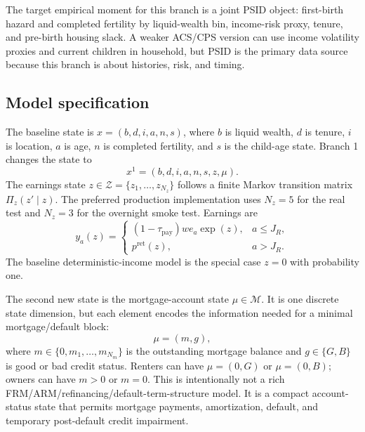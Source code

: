 \documentclass[11pt]{article}
\newcommand{\Zset}{\mathcal Z}
\newcommand{\Mset}{\mathcal M}
\begin{document}
The target empirical moment for this branch is a joint PSID object: first-birth hazard and completed fertility by liquid-wealth bin, income-risk proxy, tenure, and pre-birth housing slack. A weaker ACS/CPS version can use income volatility proxies and current children in household, but PSID is the primary data source because this branch is about histories, risk, and timing.

\subsection{Model specification}

The baseline state is $x=(b,d,i,a,n,s)$, where $b$ is liquid wealth, $d$ is tenure, $i$ is location, $a$ is age, $n$ is completed fertility, and $s$ is the child-age state. Branch 1 changes the state to
\begin{equation}
    x^1=(b,d,i,a,n,s,z,\mu).
\end{equation}
The earnings state $z\in\Zset=\{z_1,\ldots,z_{N_z}\}$ follows a finite Markov transition matrix $\Pi_z(z'\mid z)$. The preferred production implementation uses $N_z=5$ for the real test and $N_z=3$ for the overnight smoke test. Earnings are
\begin{equation}
    y_a(z)=
    \begin{cases}
    (1-\tau_{\mathrm{pay}})w e_a \exp(z), & a\leq J_R,\\
    p^{\mathrm{ret}}(z), & a>J_R.
    \end{cases}
    \label{eq:income-risk}
\end{equation}
The baseline deterministic-income model is the special case $z=0$ with probability one.

The second new state is the mortgage-account state $\mu\in\Mset$. It is one discrete state dimension, but each element encodes the information needed for a minimal mortgage/default block:
\begin{equation}
    \mu=(m,g),
\end{equation}
where $m\in\{0,m_1,\ldots,m_{N_m}\}$ is the outstanding mortgage balance and $g\in\{G,B\}$ is good or bad credit status. Renters can have $\mu=(0,G)$ or $\mu=(0,B)$; owners can have $m>0$ or $m=0$. This is intentionally not a rich FRM/ARM/refinancing/default-term-structure model. It is a compact account-status state that permits mortgage payments, amortization, default, and temporary post-default credit impairment.
\end{document}
